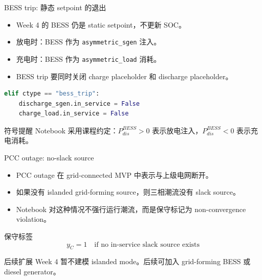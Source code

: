 \documentclass[aspectratio=169,11pt]{beamer}
\begin{document}
\begin{frame}[fragile]{BESS trip: 静态 setpoint 的退出}
\begin{itemize}
  \item Week 4 的 BESS 仍是 static setpoint，不更新 SOC。
  \item 放电时：BESS 作为 \texttt{asymmetric\_sgen} 注入。
  \item 充电时：BESS 作为 \texttt{asymmetric\_load} 消耗。
  \item BESS trip 要同时关闭 charge placeholder 和 discharge placeholder。
\end{itemize}
\begin{lstlisting}[language=Python]
elif ctype == "bess_trip":
    discharge_sgen.in_service = False
    charge_load.in_service = False
\end{lstlisting}
\begin{alertblock}{符号提醒}
Notebook 采用课程约定：$P^{BESS}_{dis}>0$ 表示放电注入，$P^{BESS}_{dis}<0$ 表示充电消耗。
\end{alertblock}
\end{frame}

\begin{frame}{PCC outage: no-slack source}
\begin{itemize}
  \item PCC outage 在 grid-connected MVP 中表示与上级电网断开。
  \item 如果没有 islanded grid-forming source，则三相潮流没有 slack source。
  \item Notebook 对这种情况不强行运行潮流，而是保守标记为 non-convergence violation。
\end{itemize}
\begin{block}{保守标签}
\[
y_C=1 \quad \text{if no in-service slack source exists}
\]
\end{block}
\begin{exampleblock}{后续扩展}
Week 4 暂不建模 islanded mode。后续可加入 grid-forming BESS 或 diesel generator。
\end{exampleblock}
\end{frame}
\end{document}
